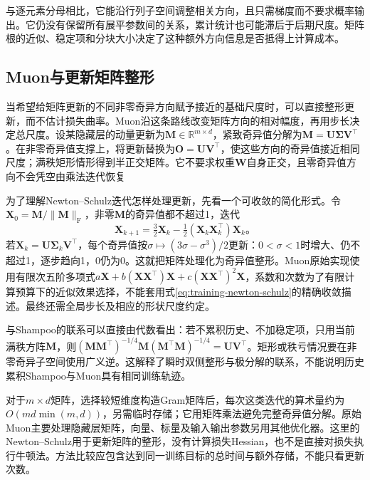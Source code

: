 与逐元素分母相比，它能沿行列子空间调整相关方向，且只需梯度而不要求概率输出。它仍没有保留所有展平参数间的关系，累计统计也可能滞后于后期尺度。矩阵根的近似、稳定项和分块大小决定了这种额外方向信息是否抵得上计算成本。

\subsection{Muon与更新矩阵整形}
\label{sec:training-muon}

当希望给矩阵更新的不同非零奇异方向赋予接近的基础尺度时，可以直接整形更新，而不估计损失曲率。Muon沿这条路线改变矩阵方向的相对幅度，再用步长决定总尺度。设某隐藏层的动量更新为$\bm M\in\mathbb R^{m\times d}$，紧致奇异值分解为$\bm M=\bm U\bm\Sigma\bm V^{\top}$。在非零奇异值支撑上，将更新替换为$\bm O=\bm U\bm V^{\top}$，使这些方向的奇异值接近相同尺度；满秩矩形情形得到半正交矩阵。它不要求权重$\bm W$自身正交，且零奇异值方向不会凭空由乘法迭代恢复

为了理解Newton--Schulz迭代怎样处理更新，先看一个可收敛的简化形式。令$\bm X_0=\bm M/\lVert\bm M\rVert_{\mathrm F}$，非零$\bm M$的奇异值都不超过1，迭代
\begin{equation}
  \bm X_{k+1}=\tfrac32\bm X_k-
             \tfrac12(\bm X_k\bm X_k^{\top})\bm X_k\text{。}
  \label{eq:training-newton-schulz}
\end{equation}
若$\bm X_k=\bm U\bm\Sigma_k\bm V^{\top}$，每个奇异值按$\sigma\mapsto(3\sigma-\sigma^3)/2$更新：$0<\sigma<1$时增大、仍不超过1，逐步趋向1，0仍为0。这就把矩阵处理化为奇异值整形。Muon原始实现使用有限次五阶多项式$a\bm X+b(\bm X\bm X^{\top})\bm X+c(\bm X\bm X^{\top})^2\bm X$，系数和次数为了有限计算预算下的近似效果选择，不能套用式\eqref{eq:training-newton-schulz}的精确收敛描述。最终还需全局步长及相应的形状尺度约定。

与Shampoo的联系可以直接由代数看出：若不累积历史、不加稳定项，只用当前满秩方阵$\bm M$，则$(\bm M\bm M^{\top})^{-1/4}\bm M(\bm M^{\top}\bm M)^{-1/4}=\bm U\bm V^{\top}$。矩形或秩亏情况要在非零奇异子空间使用广义逆。这解释了瞬时双侧整形与极分解的联系，不能说明历史累积Shampoo与Muon具有相同训练轨迹。

对于$m\times d$矩阵，选择较短维度构造Gram矩阵后，每次这类迭代的算术量约为$O(md\min(m,d))$，另需临时存储；它用矩阵乘法避免完整奇异值分解。原始Muon主要处理隐藏层矩阵，向量、标量及输入输出参数另用其他优化器。这里的Newton--Schulz用于更新矩阵的整形，没有计算损失Hessian，也不是直接对损失执行牛顿法。方法比较应包含达到同一训练目标的总时间与额外存储，不能只看更新次数。

